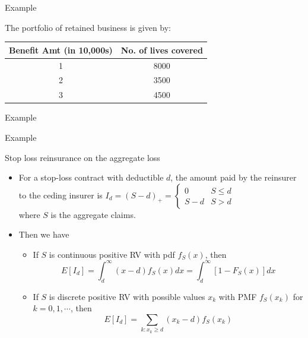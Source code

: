 \documentclass[11pt]{beamer}
\begin{document}
\begin{frame}{Example}
\vspace{- 2.5 cm}

The portfolio of retained business is given by:

\begin{table}[]
\begin{tabular}{|c|c|}
\hline
Benefit Amt (in 10,000s) & No. of lives covered \\ \hline
1                        & 8000                 \\ \hline
2                        & 3500                 \\ \hline
3                        & 4500                 \\ \hline
\end{tabular}
\end{table}




\end{frame}
\begin{frame}{Example}

\end{frame}
\begin{frame}{Example}

\end{frame}
\begin{frame}{Stop loss reinsurance on the aggregate loss}
  \begin{itemize}
  \item For a stop-loss contract with deductible $d$, the amount paid by the reinsurer to the ceding insurer is
    $I_d=(S-d)_+=\begin{cases}
      0&S\le d\\
      S-d& S>d
    \end{cases}
    $\\
    where $S$ is the aggregate claims.
  \item Then
    we have
    \begin{itemize}
    \item If $S$ is continuous positive RV with pdf $f_S(x)$, then
$$E[I_d]=\int_d^\infty (x-d)f_S(x)dx=\int_d^\infty [1-F_S(x)]dx$$
    \item If $S$ is discrete positive RV with possible values $x_k$ with PMF $f_S(x_k)$ for $k=0,1,\cdots$, then
    $$E[I_d]=\sum_{k:x_k\ge d} (x_k-d)f_S(x_k)$$
    \end{itemize}
    \end{itemize}
\end{frame}
\end{document}
